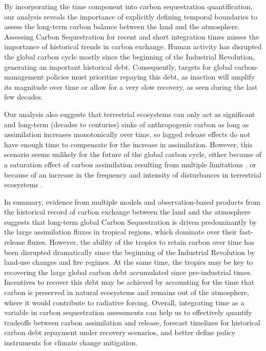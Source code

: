 \documentclass[9pt,twocolumn,twoside]{pnas-new}
\begin{document}
By incorporating the time component into carbon sequestration quantification, our analysis reveals the importance of explicitly defining temporal boundaries to assess the long-term carbon balance between the land and the atmosphere. Assessing Carbon Sequestration for recent and short integration times misses the importance of historical trends in carbon exchange. Human activity has disrupted the global carbon cycle mostly since the beginning of the Industrial Revolution, generating an important historical debt. Consequently, targets for global carbon-management policies must prioritize repaying this debt, as inaction will amplify its magnitude over time or allow for a very slow recovery, as seen during the last few decades.

Our analysis also suggests that terrestrial ecosystems can only act as significant and long-term (decades to centuries) sinks of anthropogenic carbon as long as assimilation increases monotonically over time, so lagged release effects do not have enough time to compensate for the increase in assimilation. However, this scenario seems unlikely for the future of the global carbon cycle, either because of a saturation effect of carbon assimilation resulting from multiple limitations \cite{Melnikova2021,Friedlingstein2023}, or because of an increase in the frequency and intensity of disturbances in terrestrial ecosystems \cite{Xu2021,Sitch2024}.

In summary, evidence from multiple models and observation-based products from the historical record of carbon exchange between the land and the atmosphere suggests that long-term global Carbon Sequestration is driven predominantly by the large assimilation fluxes in tropical regions, which dominate over their fast-release fluxes. However, the ability of the tropics to retain carbon over time has been disrupted dramatically since the beginning of the Industrial Revolution by land-use changes and fire regimes. At the same time, the tropics may be key to recovering the large global carbon debt accumulated since pre-industrial times. Incentives to recover this debt may be achieved by accounting for the time that carbon is preserved in natural ecosystems and remains out of the atmosphere, where it would contribute to radiative forcing. Overall, integrating time as a variable in carbon sequestration assessments can help us to effectively quantify tradeoffs between carbon assimilation and release, forecast timelines for historical carbon debt repayment under recovery scenarios, and better define policy instruments for climate change mitigation.
\end{document}
